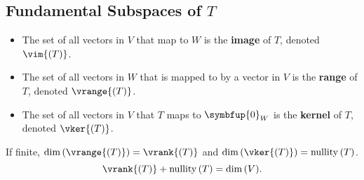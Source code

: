 \documentclass{article}
\DeclareMathOperator*{\nullity}{nullity}
\begin{document}
\begin{multicols*}{3}
    \subsection{Fundamental Subspaces of \texorpdfstring{\(T\)}{T}}
    \begin{itemize}
        \item The set of all vectors in \(V\) that map to \(W\) is the \textbf{image} of \(T\), denoted \(\vim{\left( T \right)}\).
        \item The set of all vectors in \(W\) that is mapped to by a vector in \(V\) is the \textbf{range} of \(T\), denoted \(\vrange{\left( T \right)}\).
        \item The set of all vectors in \(V\) that \(T\) maps to \(\symbfup{0}_W\) is the \textbf{kernel} of \(T\), denoted \(\vker{\left( T \right)}\).
    \end{itemize}
    If finite, \(\dim{\left( \vrange{\left( T \right)} \right)} = \vrank{\left( T \right)}\)
    and \(\dim{\left( \vker{\left( T \right)} \right)} = \nullity{\left( T \right)}\).
    \begin{equation*}
        \vrank{\left( T \right)} + \nullity{\left( T \right)} = \dim{\left( V \right)}.
    \end{equation*}

\end{multicols*}
\end{document}
